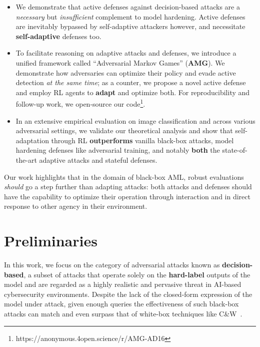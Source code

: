 \begin{itemize} %
\item We demonstrate that active defenses against decision-based attacks are a \textit{necessary} but \textit{insufficient} complement to model hardening.
Active defenses are inevitably bypassed by self-adaptive attackers however, and necessitate \textbf{self-adaptive} defenses too.
\item To facilitate reasoning on adaptive attacks and defenses, we introduce a unified framework called ``Adversarial Markov Games'' (\textbf{AMG}).
We demonstrate how adversaries can optimize their policy and evade active detection \textit{at the same time}; as a counter, we propose a novel active defense and employ RL agents to \textbf{adapt} and optimize both.
For reproducibility and follow-up work, we open-source our code\footnote{https://anonymous.4open.science/r/AMG-AD16}.
\item In an extensive empirical evaluation on image classification and across various adversarial settings, we validate our theoretical analysis and show that self-adaptation through RL \textbf{outperforms} vanilla black-box attacks, model hardening defenses like adversarial training, and notably \textbf{both} the state-of-the-art adaptive attacks and stateful defenses.
\end{itemize}

Our work highlights that in the domain of black-box \gls{AML}, robust evaluations \textit{should} go a step further than adapting attacks: both attacks and defenses should have the capability to optimize their operation through interaction and in direct response to other agency in their environment.

\section{Preliminaries}
\label{sec:background}
In this work, we focus on the category of adversarial attacks known as \textbf{decision-based}, a subset of  attacks that operate solely on the \textbf{hard-label} outputs of the model and are regarded as a highly realistic and pervasive threat in AI-based cybersecurity environments.
Despite the lack of the closed-form expression of the model under attack, given enough queries the effectiveness of such black-box attacks can match and even surpass that of white-box techniques like C\&W~\cite{carlini2017towards}.

